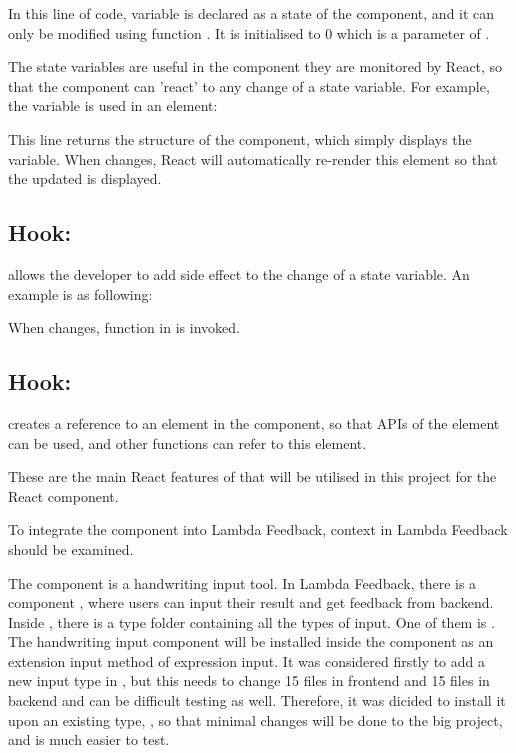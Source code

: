 \documentclass[12pt,twoside]{report}
\begin{document}
In this line of code, variable  is declared as a state of the component, and it can only be modified using function . It is initialised to 0 which is a parameter of .

The state variables are useful in the component they are monitored by React, so that the component can 'react' to any change of a state variable. For example, the  variable is used in an element:

\centerline{}

This line returns the structure of the component, which simply displays the  variable. When  changes, React will automatically re-render this element so that the updated  is displayed.

\subsection*{Hook: }
\label{subsec:useEffect}
 allows the developer to add side effect to the change of a state variable. An example is as following:

\centerline{}

When  changes, function in  is invoked.

\subsection*{Hook: }
\label{subsec:useRef}
 creates a reference to an element in the component, so that APIs of the element can be used, and other functions can refer to this element.

These are the main React features of that will be utilised in this project for the React component. 

To integrate the component into Lambda Feedback, context in Lambda Feedback should be examined.

The component is a handwriting input tool. In Lambda Feedback, there is a
component , where users can input their result and get
feedback from backend. Inside , there is a type folder
containing all the types of input. One of them is . The
handwriting input component will be installed inside the 
component as an extension input method of expression input. It was considered
firstly to add a new input type in , but this needs to change 15 files in frontend and 15 files in backend and can be difficult testing as well. Therefore, it was dicided to install it upon an existing type, , so that minimal changes will be done to the big project, and is much easier to test.
\end{document}
